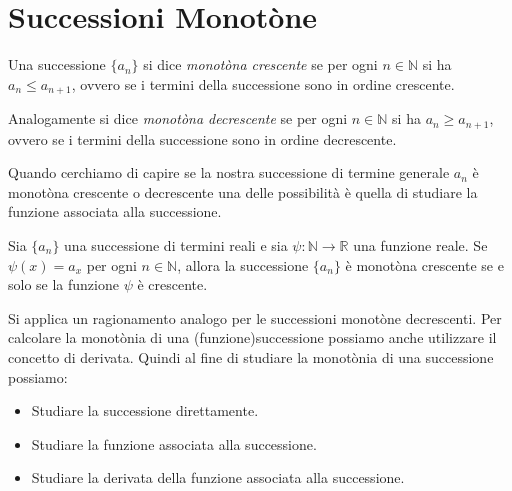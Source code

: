 \section{Successioni Monotòne}
    \begin{definizione}
        Una successione $\{a_n\}$ si dice \emph{monotòna crescente} se per ogni $n \in \mathbb{N}$ si ha $a_n \leq a_{n+1}$, ovvero se i termini della successione sono in ordine crescente.
    \end{definizione}    
    \begin{definizione}
        Analogamente si dice \emph{monotòna decrescente} se per ogni $n \in \mathbb{N}$ si ha $a_n \geq a_{n+1}$, ovvero se i termini della successione sono in ordine decrescente.
    \end{definizione}
    Quando cerchiamo di capire se la nostra successione di termine generale $a_n$ è monotòna crescente o decrescente una delle possibilità è quella di studiare la funzione associata alla successione.
    \begin{definizione}
        Sia $\{a_n\}$ una successione di termini reali e sia $\psi: \mathbb{N} \to \mathbb{R}$ una funzione reale. Se $\psi(x) = a_x$ per ogni $n \in \mathbb{N}$, allora la successione $\{a_n\}$ è monotòna crescente se e solo se la funzione $\psi$ è crescente.
    \end{definizione}
    Si applica un ragionamento analogo per le successioni monotòne decrescenti.
    Per calcolare la monotònia di una (funzione)successione possiamo anche utilizzare il concetto di derivata.
    Quindi al fine di studiare la monotònia di una successione possiamo:
    \begin{itemize}
        \item Studiare la successione direttamente.
        \item Studiare la funzione associata alla successione.
        \item Studiare la derivata della funzione associata alla successione.
    \end{itemize}
